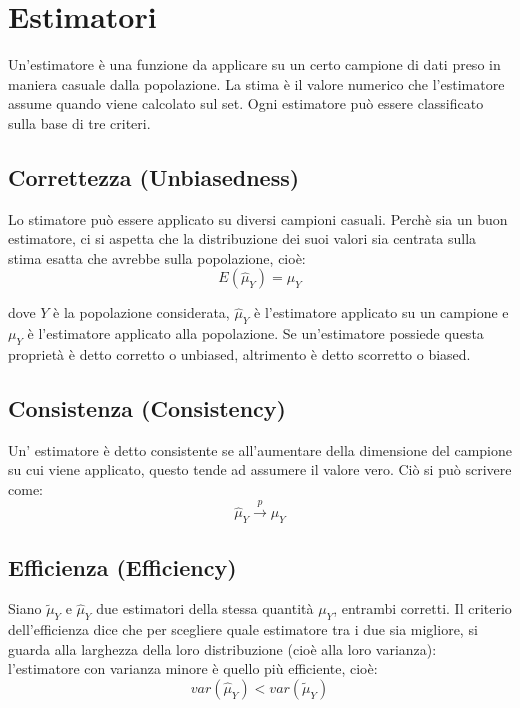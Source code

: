 \documentclass[]{article}
\begin{document}
\section{Estimatori}

Un'estimatore è una funzione da applicare su un certo campione di dati preso in maniera casuale dalla popolazione. La stima è il valore numerico che l'estimatore assume quando viene calcolato sul set. Ogni estimatore può essere classificato sulla base di tre criteri.

\subsection{Correttezza (Unbiasedness)}
Lo stimatore può essere applicato su diversi campioni casuali. Perchè sia un buon estimatore, ci si aspetta che la distribuzione dei suoi valori sia centrata sulla stima esatta che avrebbe sulla popolazione, cioè:
\begin{equation}
 E(\hat{\mu}_Y) = \mu_Y
\end{equation}

dove $Y$ è la popolazione considerata, $\hat{\mu}_Y$ è l'estimatore applicato su un campione e $\mu_Y$ è l'estimatore applicato alla popolazione. Se un'estimatore possiede questa proprietà è detto corretto o unbiased, altrimento è detto scorretto o biased.

\subsection{Consistenza (Consistency)}
Un' estimatore è detto consistente se all'aumentare della dimensione del campione su cui viene applicato, questo tende ad assumere il valore vero. Ciò si può scrivere come:
\begin{equation}
	\hat{\mu}_Y \xrightarrow{p} \mu_Y
\end{equation}

\subsection{Efficienza (Efficiency)}
Siano $\tilde{\mu}_Y$ e $\hat{\mu}_Y$ due estimatori della stessa quantità $\mu_Y$, entrambi corretti. Il criterio dell'efficienza dice che per scegliere quale estimatore tra i due sia migliore, si guarda alla larghezza della loro distribuzione (cioè alla loro varianza): l'estimatore con varianza minore è quello più efficiente, cioè:
\begin{equation}
 var(\hat{\mu}_Y) < var(\tilde{\mu}_Y)
\end{equation}
\end{document}
